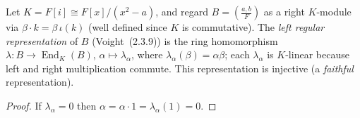 \begin{lemma}
    \label{lem:left-regular-faithful}
    \leanok
    Let $K = F[i] \cong F[x]/(x^2 - a)$, and regard $B = \left(\frac{a,b}{F}\right)$
    as a right $K$-module via $\beta \cdot k = \beta\,\iota(k)$ (well defined since
    $K$ is commutative). The \emph{left regular representation} of $B$ (Voight~(2.3.9))
    is the ring homomorphism $\lambda \colon B \to \operatorname{End}_K(B)$,
    $\alpha \mapsto \lambda_\alpha$, where $\lambda_\alpha(\beta) = \alpha\beta$; each
    $\lambda_\alpha$ is $K$-linear because left and right multiplication commute.
    This representation is injective (a \emph{faithful} representation).
\end{lemma}
\begin{proof}
    If $\lambda_\alpha = 0$ then $\alpha = \alpha\cdot 1 = \lambda_\alpha(1) = 0$.
\end{proof}


